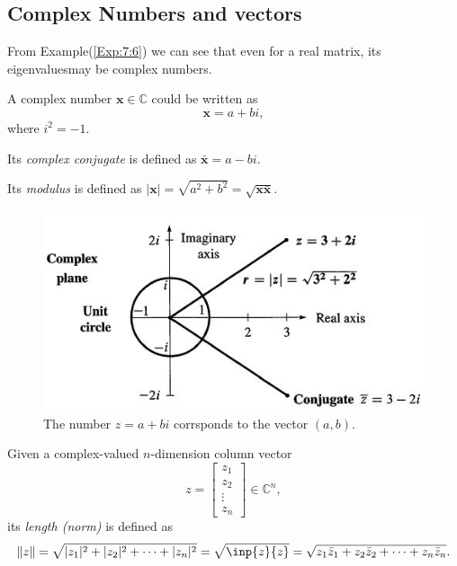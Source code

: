 \subsection{Complex Numbers and vectors}
From Example(\ref{Exp:7:6}) we can see that even for a real matrix, its eigenvaluesmay be complex numbers. 
\begin{definition}
A complex number $\bm x\in\mathbb{C}$ could be written as 
\[
\bm x=a+bi,
\] 
where $i^2=-1$.

Its \emph{complex conjugate} is defined as $\bm{\bar x}=a-bi$.

Its \emph{modulus} is defined as $|\bm x|=\sqrt{a^2+b^2}=\sqrt{\bm x\bm{\bar x}}.$
\end{definition}
\begin{figure}[H]
\centering\includegraphics{week6/complex}
\caption{The number $z=a+bi$ corrsponds to the vector 
$(a,b)$.}
\end{figure}
\begin{definition}
Given a complex-valued $n$-dimension column vector
\[
z=\begin{bmatrix}
z_1\\z_2\\\vdots\\z_n
\end{bmatrix}\in\mathbb{C}^n,
\] 
its \emph{length (norm)} is defined as
\[
\|z\|=\sqrt{|z_1|^2+|z_2|^2+\dots+|z_n|^2}=\sqrt{\inp{z}{z}}=\sqrt{z_1\bar z_1+z_2\bar z_2+\dots+z_n\bar z_n}.
\]
\end{definition}

